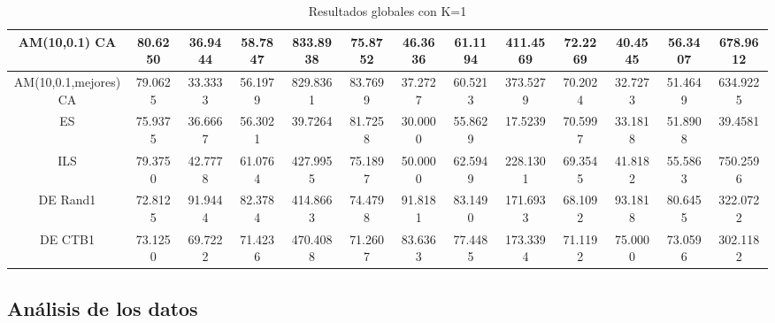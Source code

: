 \documentclass[12pt,a4paper]{article}
\begin{document}
\begin{table}[h!]
{\begin{tabular}{| c | c | c | c | c | c | c | c | c | c | c | c | c |}
				AM(10,0.1) CA & 80.6250 & 36.9444 & 58.7847 & 833.8938 & 75.8752 & 46.3636 & 61.1194 & 411.4569 & 72.2269 & 40.4545 & 56.3407 & 678.9612 \\ [0.5ex] \hline
				AM(10,0.1,mejores) CA & 79.0625 & 33.3333 & 56.1979 & 829.8361 & 83.7699 & 37.2727 & 60.5213 & 373.5279 & 70.2024 & 32.7273 & 51.4649 & 634.9225 \\ [0.5ex] \hline
				ES & 75.9375 & 36.6667 & 56.3021 & 39.7264 & 81.7258 & 30.0000 & 55.8629 & 17.5239 & 70.5997 & 33.1818 & 51.8908 & 39.4581 \\ [0.5ex] \hline
				ILS & 79.3750 & 42.7778 & 61.0764 & 427.9955 & 75.1897 & 50.0000 & 62.5949 & 228.1301 & 69.3545 & 41.8182 & 55.5863 & 750.2596 \\ [0.5ex] \hline
				DE Rand1 & 72.8125 & 91.9444 & 82.3784 & 414.8663 & 74.4798 & 91.8181 & 83.1490 & 171.6933 & 68.1092 & 93.1818 & 80.6455 & 322.0722 \\ [0.5ex] \hline
				DE CTB1 & 73.1250 & 69.7222 & 71.4236 & 470.4088 & 71.2607 & 83.6363 & 77.4485 & 173.3394 & 71.1192 & 75.0000 & 73.0596 & 302.1182 \\ [0.5ex] \hline
			\end{tabular}
		}
		\label{tablaGlobalK1}
		\caption{Resultados globales con K=1}
	\end{table}


	\newpage

	\subsection{Análisis de los datos}
\end{document}
